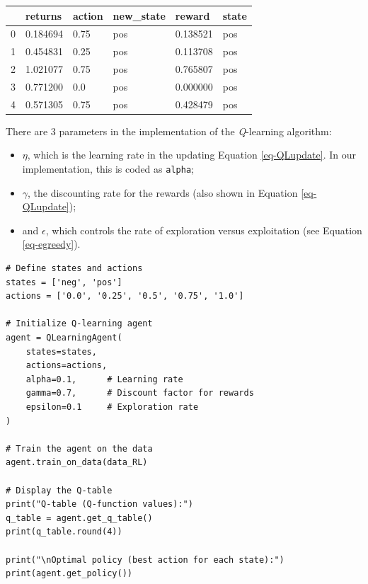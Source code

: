 \bigskip\noindent
\begin{tabular}{p{}p{}p{}p{}p{}p{}}
\toprule
 & returns & action & new\_state & reward & state \\
\hline
0 & 0.184694 & 0.75 & pos & 0.138521 & pos \\
\hline
1 & 0.454831 & 0.25 & pos & 0.113708 & pos \\
\hline
2 & 1.021077 & 0.75 & pos & 0.765807 & pos \\
\hline
3 & 0.771200 & 0.0 & pos & 0.000000 & pos \\
\hline
4 & 0.571305 & 0.75 & pos & 0.428479 & pos \\
\hline
\bottomrule
\end{tabular}

\bigskip

There are 3 parameters in the implementation of the \textit{Q}-learning algorithm:

\begin{itemize}
\item $\eta$, which is the learning rate in the updating Equation \ref{eq-QLupdate}. In our implementation, this is coded as \texttt{alpha};
\item $\gamma$, the discounting rate for the rewards (also shown in Equation \ref{eq-QLupdate});
\item and $\epsilon$, which controls the rate of exploration versus exploitation (see Equation \ref{eq-egreedy}).
\end{itemize}

\begin{verbatim}
# Define states and actions
states = ['neg', 'pos']
actions = ['0.0', '0.25', '0.5', '0.75', '1.0']

# Initialize Q-learning agent
agent = QLearningAgent(
    states=states,
    actions=actions,
    alpha=0.1,      # Learning rate
    gamma=0.7,      # Discount factor for rewards
    epsilon=0.1     # Exploration rate
)

# Train the agent on the data
agent.train_on_data(data_RL)

# Display the Q-table
print("Q-table (Q-function values):")
q_table = agent.get_q_table()
print(q_table.round(4))

print("\nOptimal policy (best action for each state):")
print(agent.get_policy())
\end{verbatim}


